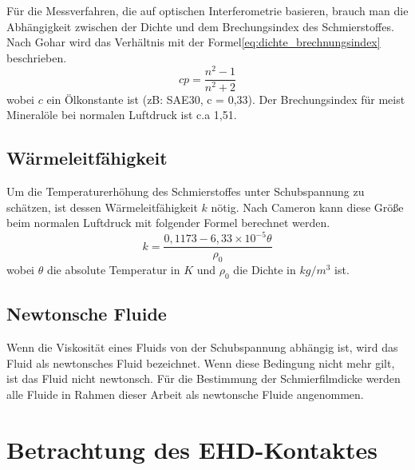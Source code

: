 Für die Messverfahren, die auf optischen Interferometrie basieren, brauch man die Abhängigkeit zwischen der Dichte und dem Brechungsindex des Schmierstoffes.
Nach Gohar wird das Verhältnis mit der Formel\ref{eq:dichte_brechnungsindex} beschrieben.
\begin{equation}
    \label{eq:dichte_brechnungsindex}
    cp = \frac{n^2 - 1}{n^2 + 2}
\end{equation}
%
wobei $c$ ein Ölkonstante ist (zB: SAE30, c = 0,33).
Der Brechungsindex für meist Mineralöle bei normalen Luftdruck ist c.a 1,51.


\subsection*{Wärmeleitfähigkeit}
\label{waermeleitfaehigkeit}

Um die Temperaturerhöhung des Schmierstoffes unter Schubspannung zu schätzen, ist dessen Wärmeleitfähigkeit $k$ nötig.
Nach Cameron\cite{cameron} kann diese Größe beim normalen Luftdruck mit folgender Formel berechnet werden.
\begin{equation}
    \label{eq:waermeleitfaehigkeit}
    k = \frac{0,1173 - 6,33 \times 10^{-5} \theta}{\rho_0}
\end{equation}
%
wobei $\theta$ die absolute Temperatur in $K$ und $\rho_0$ die Dichte in $kg/m^3$ ist.

\subsection*{Newtonsche Fluide}
\label{sub:newtonsche_fluide}

Wenn die Viskosität eines Fluids von der Schubspannung abhängig ist, wird das Fluid als newtonsches Fluid bezeichnet.
Wenn diese Bedingung nicht mehr gilt, ist das Fluid nicht newtonsch.
Für die Bestimmung der Schmierfilmdicke werden alle Fluide in Rahmen dieser Arbeit als newtonsche Fluide angenommen.

\section{Betrachtung des EHD-Kontaktes}
\label{sec:betrachtung_des_ehd_kontaktes}


